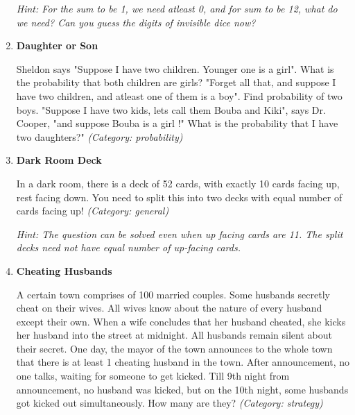 \begin{enumerate}
\small\emph{Hint: For the sum to be 1, we need atleast 0, and for sum to be 12, what do we need? Can you guess the digits of invisible dice now?}





\item \textbf{Daughter or Son}

Sheldon says "Suppose I have two children. Younger one is a girl". What is the probability that both children are girls?
"Forget all that, and suppose I have two children, and atleast one of them is a boy". Find probability of two boys.
"Suppose I have two kids, lets call them Bouba and Kiki", says Dr. Cooper, "and suppose Bouba is a girl !" What is the probability that I have two daughters?"
\small\emph{(Category: probability)}




\item \textbf{Dark Room Deck}

In a dark room, there is a deck of 52 cards, with exactly 10 cards facing up, rest facing down. You need to split this into two decks with equal number of cards facing up!
\small\emph{(Category: general)}

\small\emph{Hint: The question can be solved even when up facing cards are 11. The split decks need not have equal number of up-facing cards.}





\item \textbf{Cheating Husbands}

A certain town comprises of 100 married couples. Some husbands secretly cheat on their wives. All wives know about the nature of every husband except their own. When a wife concludes that her husband cheated, she kicks her husband into the street at midnight. All husbands remain silent about their secret. One day, the mayor of the town announces to the whole town that there is at least 1 cheating husband in the town. After announcement, no one talks, waiting for someone to get kicked. Till 9th night from announcement, no husband was kicked, but on the 10th night, some husbands got kicked out simultaneously. How many are they?
\small\emph{(Category: strategy)}


\end{enumerate}
